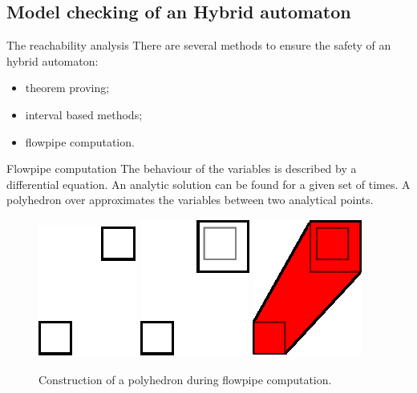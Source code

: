 \subsection{Model checking of an Hybrid automaton}
\begin{frame}{The reachability analysis}
There are several methods to ensure the safety of an hybrid automaton:
\begin{itemize}
\item theorem proving;
\item interval based methods;
\item flowpipe computation.
\end{itemize}
\begin{block}{Flowpipe computation}
The behaviour of the variables is described by a differential equation. An analytic solution can be found for a given set of times. A polyhedron over approximates the variables between two analytical points.
\end{block}
\begin{figure}
\includegraphics[scale=1]{images/flowpipe1.eps}
\hspace*{1.5cm}
\includegraphics[scale=1]{images/flowpipe2.eps}
\hspace*{1.5cm}
\includegraphics[scale=1]{images/flowpipe3.eps}
\caption{Construction of a polyhedron during flowpipe computation.}
\end{figure}

\end{frame}

